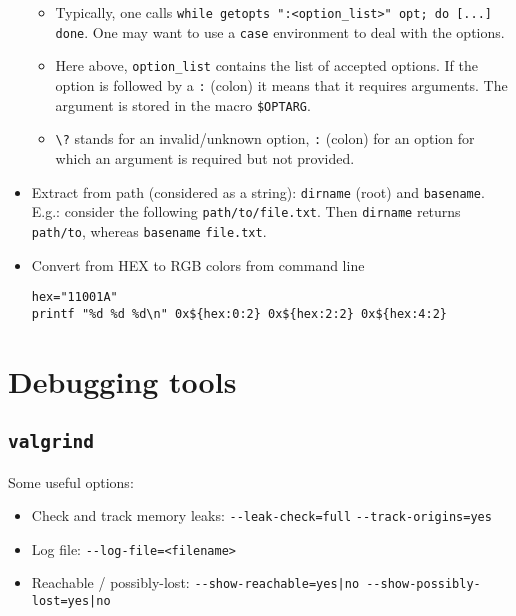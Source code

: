 \documentclass[a4paper,12pt,%
              final%
              ]{article}
\begin{document}
\begin{itemize}
    \begin{itemize}
      \item Typically, one calls \verb|while getopts ":<option_list>" opt; do [...] done|. One may want to use a \verb|case| environment to deal with the options.
      \item Here above, \verb|option_list| contains the list of accepted options. If the option is followed by a \verb|:| (colon) it means that it requires arguments. The argument is stored in the macro \verb|$OPTARG|.
      \item \verb|\?| stands for an invalid/unknown option, \verb|:| (colon) for an option for which an argument is required but not provided.
    \end{itemize}
  \item Extract from path (considered as a string): \texttt{dirname} (root) and \texttt{basename}. E.g.: consider the following \texttt{path/to/file.txt}. Then \texttt{dirname} returns \texttt{path/to}, whereas \texttt{basename} \texttt{file.txt}.
  \item Convert from HEX to RGB colors from command line
\begin{verbatim}
hex="11001A"
printf "%d %d %d\n" 0x${hex:0:2} 0x${hex:2:2} 0x${hex:4:2}
\end{verbatim}
\end{itemize}

\section{Debugging tools}
\subsection{\texttt{valgrind}}
Some useful options:
\begin{itemize}
  \item Check and track memory leaks: \verb|--leak-check=full| \verb|--track-origins=yes|
  \item Log file: \verb|--log-file=<filename>|
  \item Reachable / possibly-lost: \verb!--show-reachable=yes|no --show-possibly-lost=yes|no!
\end{itemize}

\end{document}
